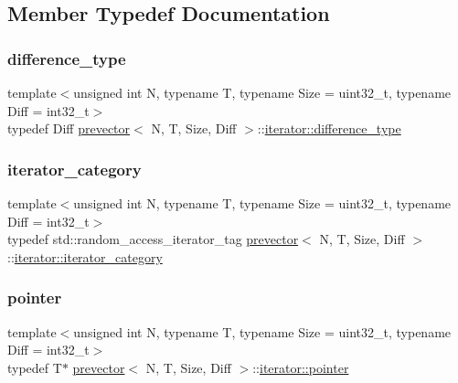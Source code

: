 \subsection{Member Typedef Documentation}
\mbox{\label{classprevector_1_1iterator_a9540618843eb1657d30f7890d04ee6f0}} 
\subsubsection{\texorpdfstring{difference\+\_\+type}{difference\_type}}
{\footnotesize\ttfamily template$<$unsigned int N, typename T, typename Size = uint32\+\_\+t, typename Diff = int32\+\_\+t$>$ \\
typedef Diff \mbox{\hyperlink{classprevector}{prevector}}$<$ N, T, Size, Diff $>$\+::\mbox{\hyperlink{classprevector_1_1iterator_a9540618843eb1657d30f7890d04ee6f0}{iterator\+::difference\+\_\+type}}}

\mbox{\label{classprevector_1_1iterator_accf46d24c818422d68e6ea3ea60305f8}} 
\subsubsection{\texorpdfstring{iterator\+\_\+category}{iterator\_category}}
{\footnotesize\ttfamily template$<$unsigned int N, typename T, typename Size = uint32\+\_\+t, typename Diff = int32\+\_\+t$>$ \\
typedef std\+::random\+\_\+access\+\_\+iterator\+\_\+tag \mbox{\hyperlink{classprevector}{prevector}}$<$ N, T, Size, Diff $>$\+::\mbox{\hyperlink{classprevector_1_1iterator_accf46d24c818422d68e6ea3ea60305f8}{iterator\+::iterator\+\_\+category}}}

\mbox{\label{classprevector_1_1iterator_af25d07eb9d72ffc3f3b302c5f8de62c3}} 
\subsubsection{\texorpdfstring{pointer}{pointer}}
{\footnotesize\ttfamily template$<$unsigned int N, typename T, typename Size = uint32\+\_\+t, typename Diff = int32\+\_\+t$>$ \\
typedef T$\ast$ \mbox{\hyperlink{classprevector}{prevector}}$<$ N, T, Size, Diff $>$\+::\mbox{\hyperlink{classprevector_1_1iterator_af25d07eb9d72ffc3f3b302c5f8de62c3}{iterator\+::pointer}}}

